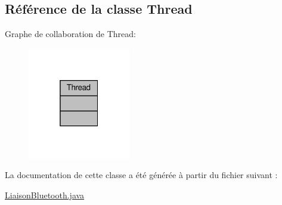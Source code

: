 \hypertarget{class_thread}{}\subsection{Référence de la classe Thread}
\label{class_thread}


Graphe de collaboration de Thread\+:
\nopagebreak
\begin{figure}[H]
\begin{center}
\leavevmode
\includegraphics[width=127pt]{class_thread__coll__graph}
\end{center}
\end{figure}


La documentation de cette classe a été générée à partir du fichier suivant \+:\begin{DoxyCompactItemize}
\item 
\hyperlink{_liaison_bluetooth_8java}{Liaison\+Bluetooth.\+java}\end{DoxyCompactItemize}
